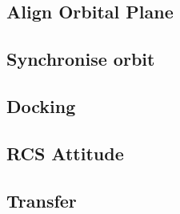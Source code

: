 \documentclass[Orbiter User Manual.tex]{subfiles}
\begin{document}
\subsection{Align Orbital Plane}

\subsection{Synchronise orbit}

\subsection{Docking}

\subsection{RCS Attitude}

\subsection{Transfer}
\end{document}
